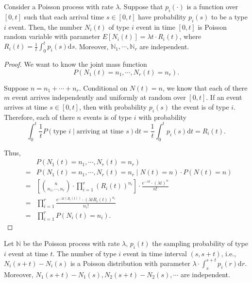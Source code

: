 \begin{corollary}[推論]
Consider a Poisson process with rate $ \lambda $. Suppose that $ p_{i}(\cdot) $ is a function over $ [0, t] $ such that each arrival time $ s \in [0, t] $ have probability $ p_{i}(s) $ to be a type $ i $ event. Then, the number $ N_{i}(t) $ of type $ i $ event in time $ [0, t] $ is Poisson random variable with parameter $ E[N_{i}(t)] = \lambda t \cdot R_{i}(t) $, where $ R_{i}(t) = \frac{1}{t} \int_{0}^{t} p_{i}(s) \mathrm{d}s $. Moreover, $ \mathbb{N}_{1}, \cdots, \mathbb{N}_{r} $ are independent.

\begin{proof}
We want to know the joint mass function
\[ P(N_{1}(t) = n_{1}, \cdots, N_{r}(t) = n_{r}). \]

Suppose $ n = n_{1} + \cdots + n_{r} $. Conditional on $ N(t) = n $, we know that each of there $ m $ event arrives independently and uniformly at random over $ [0, t] $. If an event arrives at time $ s \in [0, t] $, then with probability $ p_{i}(s) $ the event is of type $ i $. Therefore, each of there $ n $ events is of type $ i $ with probability
\[ \int_{0}^{t} \frac{1}{t} P(\text{type } i \mid \text{arriving at time } s) \mathrm{d}t = \frac{1}{t} \int_{0}^{t}  p_{i}(s) \mathrm{d}t = R_{i}(t). \]

Thus,
\begin{eqnarray*}
  &   & P(N_{1}(t) = n_{1}, \cdots, N_{r}(t) = n_{r}) \\
  & = & P(N_{1}(t) = n_{1}, \cdots, N_{r}(t) = n_{r} \mid N(t) = n) \cdot P(N(t) = n) \\
  & = & \left[ {{n}\choose{n_{1}, \cdots, n_{r}}} \cdot \prod_{i = 1}^{r} (R_{i}(t))^{n_{i}} \right] \cdot \frac{e^{-\lambda t} \cdot (\lambda t)^{n}}{n!} \\
  & = & \prod_{i = 1}^{r} \frac{e^{-\lambda t (R_{i}(t))} \cdot (\lambda t R_{i}(t))^{n_{i}}}{n_{i}!} \\
  & = & \prod_{i = 1}^{r} P(N_{i}(t) = n_{i}).
\end{eqnarray*}
\end{proof}
\end{corollary}

\begin{corollary}[推廣推論] \label{cor:ext_cor}
Let $ \mathbb{N} $ be the Poisson process with rate $ \lambda $, $ p_{i}(t) $ the sampling probability of type $ i $ event at time $ t $. The number of type $ i $ event in time interval $ (s, s + t) $, i.e., $ N_{i}(s + t) - N_{i}(s) $ is a Poisson distribution with parameter $ \lambda \cdot \int_{s}^{s + t} p_{i}(r) \mathrm{d}r $. Moreover, $ N_{1}(s + t) - N_{1}(s), N_{2}(s + t) - N_{2}(s), \cdots $ are independent.
\end{corollary}

